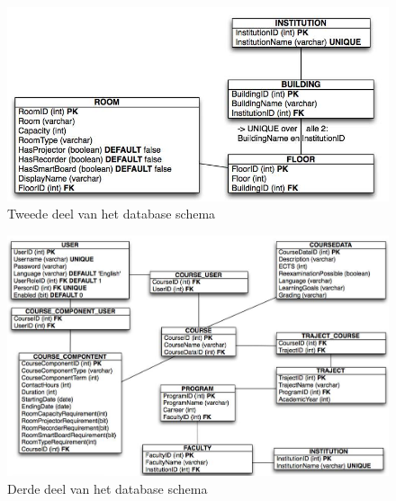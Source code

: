\begin{figure}[H]
	\centering
	\includegraphics[scale=0.4]{design/EER/schema2}
	\caption{Tweede deel van het database schema}
	\label{fig:db2}
\end{figure}

\begin{figure}[H]
	\centering
	\includegraphics[scale=0.4]{design/EER/schema3}
	\caption{Derde deel van het database schema}
	\label{fig:db3}
\end{figure}